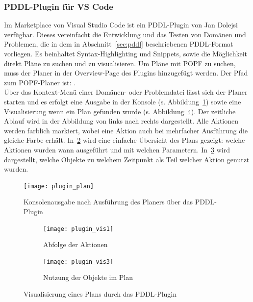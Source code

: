 \subsubsection{\acs{PDDL}-Plugin für VS Code}
Im Marketplace von Visual Studio Code ist ein PDDL-Plugin von Jan Dolejsi verfügbar.
Dieses vereinfacht die Entwicklung und das Testen von Domänen und Problemen, die in dem in Abschnitt~\ref{sec:pddl} beschriebenen \ac{PDDL}-Format vorliegen.
Es beinhaltet Syntax-Highlighting und Snippets, sowie die Möglichkeit direkt Pläne zu suchen und zu visualisieren.
Um Pläne mit \ac{POPF} zu suchen, muss der Planer in der Overview-Page des Plugins hinzugefügt werden.
Der Pfad zum \ac{POPF}-Planer ist: .\\
Über das Kontext-Menü einer Domänen- oder Problemdatei lässt sich der Planer starten und es erfolgt eine Ausgabe in der Konsole (s. Abbildung~\ref{fig:pluginplan}) sowie eine Visualisierung wenn ein Plan gefunden wurde (s. Abbildung~\ref{fig:pluginvis}).
Der zeitliche Ablauf wird in der Abbildung von links nach rechts dargestellt.
Alle Aktionen werden farblich markiert, wobei eine Aktion auch bei mehrfacher Ausführung die gleiche Farbe erhält.
In~\ref{fig:planvis_actions} wird eine einfache Übersicht des Plans gezeigt: welche Aktionen wurden wann ausgeführt und mit welchen Parametern.
In~\ref{fig:planvis_objects} wird dargestellt, welche Objekte zu welchem Zeitpunkt als Teil welcher Aktion genutzt wurden.
\begin{figure}[ht!]
    \centering
    \texttt{[image: plugin\_plan]}
    \caption{Konsolenausgabe nach Ausführung des Planers über das \acs{PDDL}-Plugin}
    \label{fig:pluginplan}
\end{figure}
\begin{figure}[ht!]
    \centering
    \begin{subfigure}[b]{0.55\textwidth}
        \centering
        \texttt{[image: plugin\_vis1]}
        \caption{Abfolge der Aktionen}
        \label{fig:planvis_actions}
    \end{subfigure}
    \begin{subfigure}[b]{0.35\textwidth}
        \centering
        \texttt{[image: plugin\_vis3]}
        \caption{Nutzung der Objekte im Plan}
        \label{fig:planvis_objects}
    \end{subfigure}
    \caption{Visualisierung eines Plans durch das \acs{PDDL}-Plugin}
    \label{fig:pluginvis}
\end{figure}
